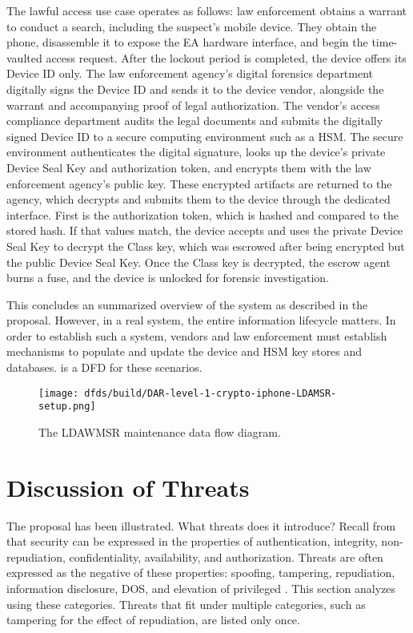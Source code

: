 The lawful access use case operates as follows: law enforcement obtains a warrant to conduct a search, including the
suspect's mobile device. They obtain the phone, disassemble it to expose the \ac{EA} hardware interface, and begin the
time-vaulted access request. After the lockout period is completed, the device offers its Device ID only. The law
enforcement agency's digital forensics department digitally signs the Device ID and sends it to the device vendor,
alongside the warrant and accompanying proof of legal authorization. The vendor's access compliance department audits
the legal documents and submits the digitally signed Device ID to a secure computing environment such as a \ac{HSM}. The
secure environment authenticates the digital signature, looks up the device's private Device Seal Key and authorization
token, and encrypts them with the law enforcement agency's public key. These encrypted artifacts are returned to the
agency, which decrypts and submits them to the device through the dedicated interface. First is the authorization token,
which is hashed and compared to the stored hash. If that values match, the device accepts and uses the private Device
Seal Key to decrypt the Class key, which was escrowed after being encrypted but the public Device Seal Key. Once the
Class key is decrypted, the escrow agent burns a fuse, and the device is unlocked for forensic investigation.

This concludes an summarized overview of the system as described in the proposal. However, in a real system, the entire
information lifecycle matters. In order to establish such a system, vendors and law enforcement must establish
mechanisms to populate and update the device and \ac{HSM} key stores and databases.  is a
\ac{DFD} for these scenarios.

\begin{figure}[H]
  \centering\CaptionFontSize
  \texttt{[image: dfds/build/DAR-level-1-crypto-iphone-LDAMSR-setup.png]}
  \caption{The LDAWMSR maintenance data flow diagram.}
  \label{fig-dfd-ldawmsr-setup}
\end{figure}


\section{Discussion of Threats}
\label{sec-prop-threats}

The proposal has been illustrated. What threats does it introduce? Recall from  that security
can be expressed in the properties of authentication, integrity, non-repudiation, confidentiality, availability, and
authorization. Threats are often expressed as the negative of these properties: spoofing, tampering, repudiation,
information disclosure, \acl{DOS}, and elevation of privileged \cite{shostack_threat_2014}. This section
analyzes \ldawmsr using these categories. Threats that fit under multiple categories, such as tampering for the effect
of repudiation, are listed only once.

